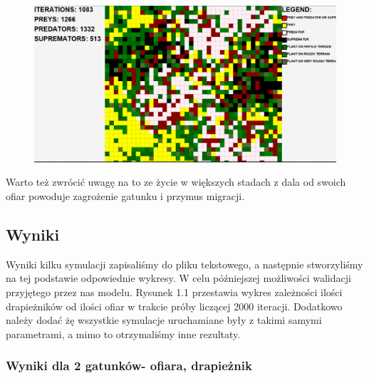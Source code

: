 \begin{figure}[!htb]
	\centering
	\includegraphics[width=1.1\linewidth]{img/dare3}
	\caption{\label{fig:pps3} }
\end{figure}

 Warto też zwrócić uwagę na to ze życie w większych stadach z dala od swoich ofiar powoduje zagrożenie gatunku i przymus migracji.
 
\newpage
\subsection{Wyniki}

Wyniki kilku symulacji zapisaliśmy do pliku tekstowego, a następnie stworzyliśmy na tej podstawie odpowiednie wykresy. W celu późniejszej możliwości walidacji przyjętego przez nas modelu.
Rysunek 1.1 przestawia wykres zależności ilości drapieżników od ilości ofiar w trakcie próby liczącej 2000 iteracji.
Dodatkowo należy dodać żę wszystkie symulacje uruchamiane były z takimi samymi parametrami, a mimo to otrzymaliśmy inne rezultaty. 
\newpage




\subsubsection{Wyniki dla 2 gatunków- ofiara, drapieżnik}


